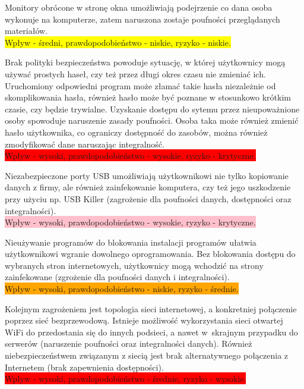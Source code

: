 Monitory obrócone w stronę okna umożliwiają podejrzenie co dana osoba wykonuje na komputerze, zatem naruszona zostaje poufności przeglądanych materiałów. \\ \colorbox{yellow}{Wpływ - średni, prawdopodobieństwo - niskie, ryzyko - niskie.}

Brak polityki bezpieczeństwa powoduje sytuację, w której użytkownicy mogą używać prostych haseł, czy też przez długi okres czasu nie zmieniać ich. Uruchomiony odpowiedni program może złamać takie hasła niezależnie od skomplikowania hasła, również hasło może być poznane w stosunkowo krótkim czasie, czy będzie trywialne. Uzyskanie dostępu do sytemu przez nieupoważnione osoby spowoduje naruszenie zasady poufności. Osoba taka może również zmienić hasło użytkownika, co ograniczy dostępność do zasobów, można również zmodyfikować dane naruszając integralność. \\  \colorbox{red}{Wpływ - wysoki, prawdopodobieństwo - wysokie, ryzyko - krytyczne.}

Niezabezpieczone porty USB umożliwiają użytkownikowi nie tylko kopiowanie danych z firmy, ale również zainfekowanie komputera, czy też jego uszkodzenie przy użyciu np. USB Killer (zagrożenie dla poufności danych, dostępności oraz integralności). \\ \colorbox{pink}{Wpływ - wysoki, prawdopodobieństwo - wysokie, ryzyko - krytyczne.}

Nieużywanie programów do blokowania instalacji programów ułatwia użytkownikowi wgranie dowolnego oprogramowania. Bez blokowania  dostępu do wybranych stron internetowych, użytkownicy mogą wchodzić na strony zainfekowane (zgrożenie dla poufności danych i integralności). \\ \colorbox{orange}{Wpływ - wysoki, prawdopodobieństwo - niskie, ryzyko - średnie.} 

Kolejnym zagrożeniem jest topologia sieci internetowej, a konkretniej połączenie poprzez sieć bezprzewodową. Istnieje możliwość wykorzystania sieci otwartej WiFi do przedostania się do innych podsieci, a nawet \linebreak w~skrajnym przypadku do serwerów (naruszenie poufności oraz integralności danych). Również niebezpieczeństwem \linebreak związanym z siecią jest brak alternatywnego połączenia z Internetem (brak zapewnienia dostępności). \\ \colorbox{red}{Wpływ - wysoki, prawdopodobieństwo - średnie, ryzyko - wysokie.}


% 
